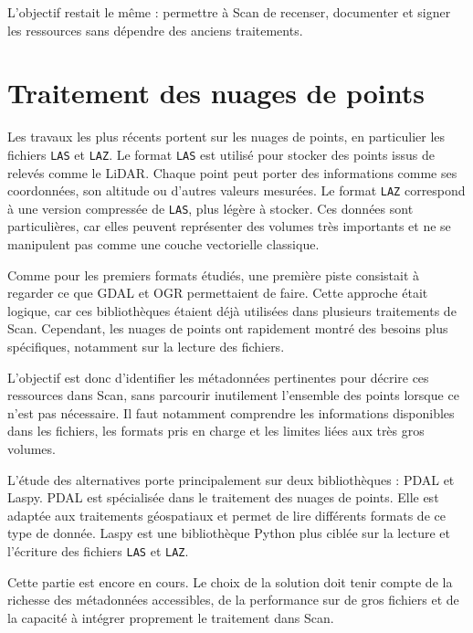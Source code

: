 L'objectif restait le même : permettre à Scan de recenser, documenter et signer
les ressources sans dépendre des anciens traitements.


\section{Traitement des nuages de points}
\label{sec:nuage_des_points}

Les travaux les plus récents portent sur les nuages de points, en particulier
les fichiers \texttt{LAS} et \texttt{LAZ}. Le format \texttt{LAS} est utilisé
pour stocker des points issus de relevés comme le LiDAR. Chaque point peut
porter des informations comme ses coordonnées, son altitude ou d'autres valeurs
mesurées. Le format \texttt{LAZ} correspond à une version compressée de
\texttt{LAS}, plus légère à stocker. Ces données sont particulières, car elles
peuvent représenter des volumes très importants et ne se manipulent pas comme
une couche vectorielle classique.

Comme pour les premiers formats étudiés, une première piste consistait à
regarder ce que GDAL et OGR permettaient de faire. Cette approche était logique,
car ces bibliothèques étaient déjà utilisées dans plusieurs traitements de Scan.
Cependant, les nuages de points ont rapidement montré des besoins plus
spécifiques, notamment sur la lecture des fichiers.

L'objectif est donc d'identifier les métadonnées pertinentes pour décrire ces
ressources dans Scan, sans parcourir inutilement l'ensemble des points lorsque
ce n'est pas nécessaire. Il faut notamment comprendre les informations
disponibles dans les fichiers, les formats pris en charge et les limites liées
aux très gros volumes.

L'étude des alternatives porte principalement sur deux bibliothèques : PDAL et
Laspy. PDAL est spécialisée dans le traitement des nuages de points. Elle est
adaptée aux traitements géospatiaux et permet de lire différents formats de ce
type de donnée. Laspy est une bibliothèque Python plus ciblée sur la lecture et
l'écriture des fichiers \texttt{LAS} et \texttt{LAZ}.

Cette partie est encore en cours. Le choix de la solution doit tenir compte de
la richesse des métadonnées accessibles, de la performance sur de gros fichiers
et de la capacité à intégrer proprement le traitement dans Scan.

